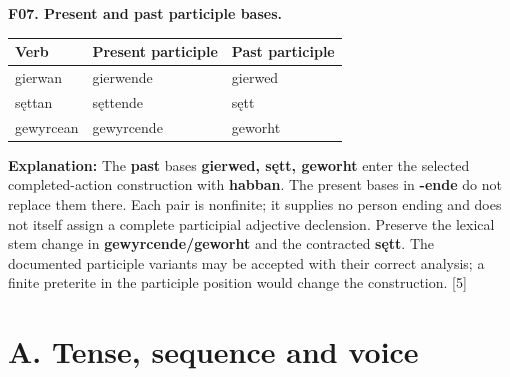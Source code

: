 \par\begin{minipage}{\linewidth}\raggedright
\textbf{F07. Present and past participle bases.}

\par\begingroup
\fontsize{10.5}{13.2}\selectfont
\setlength{\LTleft}{0pt}\setlength{\LTright}{\fill}
\noindent
\begin{tabular}{@{}>{\raggedright\arraybackslash}p{33.02mm}>{\raggedright\arraybackslash}p{44.91mm}>{\raggedright\arraybackslash}p{40.45mm}@{}}
\toprule
\textbf{Verb} & \textbf{Present participle} & \textbf{Past participle} \\
\midrule
gierwan & gierwende & gierwed \\
sęttan & sęttende & sętt \\
gewyrcean & gewyrcende & geworht \\
\bottomrule
\end{tabular}
\par\endgroup

\textbf{Explanation:} The \textbf{past} bases \textbf{gierwed, sętt, geworht} enter the selected completed-action construction with \textbf{habban}. The present bases in \textbf{-ende} do not replace them there. Each pair is nonfinite; it supplies no person ending and does not itself assign a complete participial adjective declension. Preserve the lexical stem change in \textbf{gewyrcende/\allowbreak{}geworht} and the contracted \textbf{sętt}. The documented participle variants may be accepted with their correct analysis; a finite preterite in the participle position would change the construction. [5]

\end{minipage}\par\addvspace{4pt}

\section*{A. Tense, sequence and voice}

